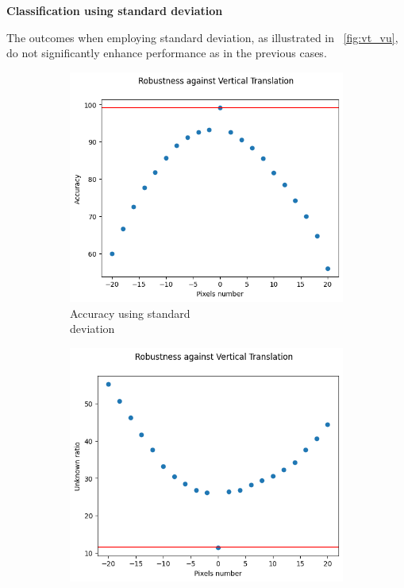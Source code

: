 \vspace{0.3cm}
\textbf{Classification using standard deviation}
\vspace{0.1cm}

The outcomes when employing standard deviation, as illustrated in \Fig~\ref{fig:vt_vu}, do not significantly enhance performance as in the previous cases.

\begin{figure}[h]
	\centering
	\begin{subfigure}{.33\textwidth}
		\centering
		\includegraphics[width=0.9\linewidth]{ImageFiles/EvalBNN/VT/VU/acc}
		\caption{Accuracy using standard \\ deviation}
		\label{fig:vt_vu_acc}
	\end{subfigure}%
	\begin{subfigure}{.33\textwidth}
		\centering
		\includegraphics[width=0.9\linewidth]{ImageFiles/EvalBNN/VT/VU/unkn}

\end{subfigure}
\end{figure}
